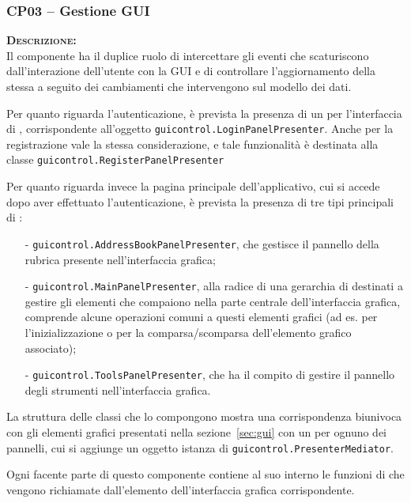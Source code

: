 \subsubsection{CP03 -- Gestione GUI}
\begin{description}
	\item{\scshape\bfseries Descrizione:}\\
Il componente ha il duplice ruolo di intercettare gli eventi che scaturiscono dall'interazione dell'utente con la GUI e di controllare l'aggiornamento della stessa a seguito dei cambiamenti che intervengono sul modello dei dati.

Per quanto riguarda l'autenticazione, è prevista la presenza di un  per l'interfaccia di , corrispondente all'oggetto \texttt{guicontrol.LoginPanelPresenter}. Anche per la registrazione vale la stessa considerazione, e tale funzionalità è destinata alla classe \texttt{guicontrol.RegisterPanelPresenter}

Per quanto riguarda invece la pagina principale dell'applicativo, cui si accede dopo aver effettuato l'autenticazione, è prevista la presenza di tre tipi principali di :
\begin{itemize}[noitemsep,nolistsep]
  \item[-] \texttt{guicontrol.AddressBookPanelPresenter}, che gestisce il pannello della rubrica presente nell'interfaccia grafica;
  \item[-] \texttt{guicontrol.MainPanelPresenter}, alla radice di una gerarchia di  destinati a gestire gli elementi che compaiono nella parte centrale dell'interfaccia grafica, comprende alcune operazioni comuni a questi elementi grafici (ad es. per l'inizializzazione o per la comparsa/scomparsa dell'elemento grafico associato);
  \item[-] \texttt{guicontrol.ToolsPanelPresenter}, che ha il compito di gestire il pannello degli strumenti nell'interfaccia grafica.
\end{itemize}

La struttura delle classi che lo compongono mostra una corrispondenza biunivoca con gli elementi grafici presentati nella sezione~\ref{sec:gui} con un  per ognuno dei pannelli, cui si aggiunge un oggetto istanza di \texttt{guicontrol.PresenterMediator}.

Ogni  facente parte di questo componente contiene al suo interno le funzioni di  che vengono richiamate dall'elemento dell'interfaccia grafica corrispondente.


\end{description}
